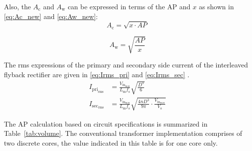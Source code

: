 \documentclass[lettersize,journal]{IEEEtran}
\begin{document}
Also, the $A_{\mathrm{c}}$ and $A_{\mathrm{w}}$ can be expressed in terms of the AP and $x$ as shown in \eqref{eq:Ac_new} and \eqref{eq:Aw_new}:
\begin{equation}
\label{eq:Ac_new}
A_{\mathrm{c}} = \sqrt{x \cdot AP}
\end{equation}

\begin{equation}
\label{eq:Aw_new}
A_{\mathrm{w}} = \sqrt{\frac{AP}{x}}
\end{equation}

The rms expressions of the primary and secondary side current of the interleaved flyback rectifier are given in \eqref{eq:Irms_pri} and \eqref{eq:Irms_sec} \cite{ref8}.
\begin{align}
I_{\mathrm{pri}_{\mathrm{rms}}} &= \frac{V_{\mathrm{in}_{\mathrm{max}}}}{L_{\mathrm{m}} f_{\mathrm{s}}} \sqrt{\frac{D^3}{6}} \label{eq:Irms_pri}\\
I_{\mathrm{sec}_{\mathrm{rms}}} &= \frac{V_{\mathrm{in}_{\mathrm{max}}}}{L_{\mathrm{m}} f_{\mathrm{s}}} \sqrt{\frac{4 n D^3}{9 \pi} \cdot \frac{V_{\mathrm{in}_{\mathrm{max}}}}{V_{\mathrm{o}}}} \label{eq:Irms_sec}
\end{align}

The AP calculation based on circuit specifications is summarized in Table~\ref{tab:volume}. The conventional transformer implementation comprises of two discrete cores, the value indicated in this table is for one core only.
\end{document}
